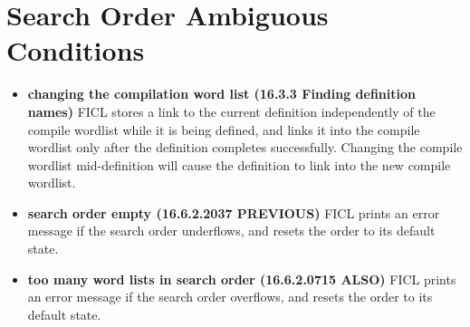 \section{Search Order Ambiguous Conditions}
\begin{itemize}[noitemsep]
	\item \textbf{changing the compilation word list (16.3.3
		Finding definition names)}\newline
	FICL stores a link to the current definition independently of
	the compile wordlist while it is being defined, and links it
	into the compile wordlist only after the definition completes
	successfully. Changing the compile wordlist mid-definition will
	cause the definition to link into the new compile wordlist.

	\item \textbf{search order empty (16.6.2.2037 PREVIOUS)}\newline
	FICL prints an error message if the search order underflows, and
	resets the order to its default state.

	\item \textbf{too many word lists in search order (16.6.2.0715
		ALSO)}\newline
	FICL prints an error message if the search order overflows, and
	resets the order to its default state.
\end{itemize}
